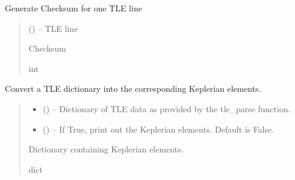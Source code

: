 \documentclass[letterpaper,10pt,english]{sphinxmanual}
\begin{document}
\begin{fulllineitems}
\label{\detokenize{fspsim.utils:fspsim.utils.Conversions.tle_checksum}}
\pysigstartsignatures
{}
\pysigstopsignatures
\sphinxAtStartPar
Generate Checksum for one TLE line
\begin{quote}\begin{description}
\sphinxAtStartPar
{} () – TLE line

\sphinxAtStartPar
Checksum

\sphinxAtStartPar
int

\end{description}\end{quote}

\end{fulllineitems}


\begin{fulllineitems}
\label{\detokenize{fspsim.utils:fspsim.utils.Conversions.tle_convert}}
\pysigstartsignatures
{}
\pysigstopsignatures
\sphinxAtStartPar
Convert a TLE dictionary into the corresponding Keplerian elements.
\begin{quote}\begin{description}
\begin{itemize}
\item {} 
\sphinxAtStartPar
{} () – Dictionary of TLE data as provided by the tle\_parse function.

\item {} 
\sphinxAtStartPar
{} () – If True, print out the Keplerian elements. Default is False.

\end{itemize}

\sphinxAtStartPar
Dictionary containing Keplerian elements.

\sphinxAtStartPar
dict

\end{description}\end{quote}

\end{fulllineitems}
\end{document}
